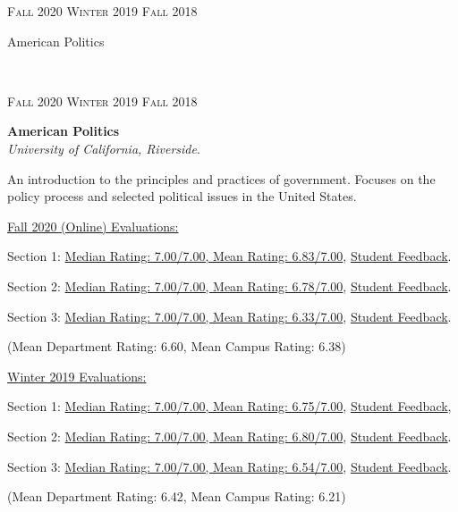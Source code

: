 \documentclass[letterpaper,11pt]{article}
\newcommand{\entry}[4]{
\ifthenelse{\isempty{#3}}
{\slimentry{#1}{#2}}{

\begin{minipage}[t]{.148\textwidth}
\flushright \textsc{#1}
\end{minipage}
\hfill\vline\hfill
\begin{minipage}[t]{.82\textwidth}
{\bf#2}\\\textit{#3}. \small{#4}
\end{minipage}\\
\vspace{.25cm}
}}
\newcommand{\slimentry}[2]{

\begin{minipage}[t]{.13\textwidth}
\hfill \textsc{#1}
\end{minipage}
\hfill\vline\hfill
\begin{minipage}[t]{.82\textwidth}
#2
\end{minipage}\\
}
\newcommand{\ucr}{University of California, Riverside}
\begin{document}
\entry{Fall 2020 Winter 2019 Fall 2018}
			{American Politics}
			{\ucr}
			{An introduction to the principles and practices of government. Focuses on the policy process and selected political issues in the United States.
			\begin{description}
				\item \underline{Fall 2020 (Online) Evaluations:}
				\item Section 1: \href{https://nrjenkins.github.io/files/docs/teaching_evals/POSC010_Fall20_Section24_Scores.pdf}{Median Rating: 7.00/7.00, Mean Rating: 6.83/7.00}, \href{https://nrjenkins.github.io/files/docs/teaching_evals/POSC010_Fall20_Section24_Comments.pdf}{Student Feedback}.
				\item Section 2: \href{https://nrjenkins.github.io/files/docs/teaching_evals/POSC010_Fall20_Section26_Scores.pdf}{Median Rating: 7.00/7.00, Mean Rating: 6.78/7.00}, \href{https://nrjenkins.github.io/files/docs/teaching_evals/POSC010_Fall20_Section26_Comments.pdf}{Student Feedback}.
				\item Section 3: \href{https://nrjenkins.github.io/files/docs/teaching_evals/POSC010_Fall20_Section32_Scores.pdf}{Median Rating: 7.00/7.00, Mean Rating: 6.33/7.00}, \href{https://nrjenkins.github.io/files/docs/teaching_evals/POSC010_Fall20_Section32_Comments.pdf}{Student Feedback}.
				\item (Mean Department Rating: 6.60, Mean Campus Rating: 6.38)
				\item \underline{Winter 2019 Evaluations:}
				\item Section 1: \href{https://nrjenkins.github.io/files/docs/teaching_evals/POSC010_Winter19_Section24_Scores.pdf}{Median Rating: 7.00/7.00, Mean Rating: 6.75/7.00}, \href{https://nrjenkins.github.io/files/docs/teaching_evals/POSC010_Winter19_Section24_Comments.pdf}{Student Feedback},
				\item Section 2: \href{https://nrjenkins.github.io/files/docs/teaching_evals/POSC010_Winter19_Section25_Scores.pdf}{Median Rating: 7.00/7.00, Mean Rating: 6.80/7.00}, \href{https://nrjenkins.github.io/files/docs/teaching_evals/POSC010_Winter19_Section25_Comments.pdf}{Student Feedback}.
				\item Section 3: \href{https://nrjenkins.github.io/files/docs/teaching_evals/POSC010_Winter19_Section26_Scores.pdf}{Median Rating: 7.00/7.00, Mean Rating: 6.54/7.00}, \href{https://nrjenkins.github.io/files/docs/teaching_evals/POSC010_Winter19_Section26_Comments.pdf}{Student Feedback}.
				\item (Mean Department Rating: 6.42, Mean Campus Rating: 6.21)

\end{description}}
\end{document}
